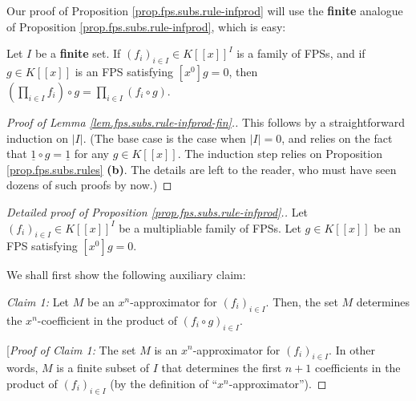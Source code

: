 \begin{fineprint}
Our proof of Proposition \ref{prop.fps.subs.rule-infprod} will use the
\textbf{finite} analogue of Proposition \ref{prop.fps.subs.rule-infprod},
which is easy:

\begin{lemma}
\label{lem.fps.subs.rule-infprod-fin}Let $I$ be a \textbf{finite} set. If
$\left(  f_{i}\right)  _{i\in I}\in K\left[  \left[  x\right]  \right]  ^{I}$
is a family of FPSs, and if $g\in K\left[  \left[  x\right]  \right]  $ is an
FPS satisfying $\left[  x^{0}\right]  g=0$, then $\left(  \prod_{i\in I}%
f_{i}\right)  \circ g=\prod_{i\in I}\left(  f_{i}\circ g\right)  $.
\end{lemma}

\begin{proof}
[Proof of Lemma \ref{lem.fps.subs.rule-infprod-fin}.]This follows by a
straightforward induction on $\left\vert I\right\vert $. (The base case is the
case when $\left\vert I\right\vert =0$, and relies on the fact that
$\underline{1}\circ g=\underline{1}$ for any $g\in K\left[  \left[  x\right]
\right]  $. The induction step relies on Proposition \ref{prop.fps.subs.rules}
\textbf{(b)}. The details are left to the reader, who must have seen dozens of
such proofs by now.)
\end{proof}

\begin{proof}
[Detailed proof of Proposition \ref{prop.fps.subs.rule-infprod}.]Let $\left(
f_{i}\right)  _{i\in I}\in K\left[  \left[  x\right]  \right]  ^{I}$ be a
multipliable family of FPSs. Let $g\in K\left[  \left[  x\right]  \right]  $
be an FPS satisfying $\left[  x^{0}\right]  g=0$.

We shall first show the following auxiliary claim:

\begin{statement}
\textit{Claim 1:} Let $M$ be an $x^{n}$-approximator for $\left(
f_{i}\right)  _{i\in I}$. Then, the set $M$ determines the $x^{n}$-coefficient
in the product of $\left(  f_{i}\circ g\right)  _{i\in I}$.
\end{statement}

[\textit{Proof of Claim 1:} The set $M$ is an $x^{n}$-approximator for
$\left(  f_{i}\right)  _{i\in I}$. In other words, $M$ is a finite subset of
$I$ that determines the first $n+1$ coefficients in the product of $\left(
f_{i}\right)  _{i\in I}$ (by the definition of \textquotedblleft$x^{n}%
$-approximator\textquotedblright).


\end{proof}
\end{fineprint}
